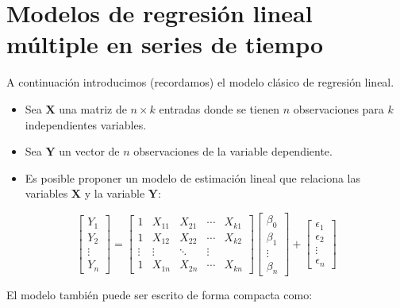 \section{Modelos de regresi\'on lineal m\'ultiple en series de tiempo}
	A continuaci\'on introducimos (recordamos) el modelo cl\'asico de regresi\'on lineal.
	\begin{itemize}
		\item Sea $\mathbf{X}$ una matriz de $n\times k$ entradas donde se tienen
		$n$ observaciones para $k$ independientes variables.
		\item Sea $\mathbf{Y}$ un vector de $n$ observaciones de la variable dependiente.
		\item Es posible proponer un modelo de estimaci\'on lineal que relaciona las
		variables $\mathbf{X}$ y la variable $\mathbf{Y}$:
	\end{itemize}
	
	\[
	\begin{bmatrix}Y_{1}\\
	Y_{2}\\
	\vdots\\
	Y_{n}
	\end{bmatrix}=\begin{bmatrix} 1 & X_{11} & X_{21} & \cdots & X_{k1}\\
	1 & X_{12} & X_{22} & \cdots & X_{k2}\\
	\vdots & \vdots & \ddots & \vdots\\
	1 & X_{1n} & X_{2n} & \cdots & X_{kn}
	\end{bmatrix}\begin{bmatrix}\beta_{0}\\
	\beta_{1}\\
	\vdots\\
	\beta_{n}
	\end{bmatrix}+\begin{bmatrix}\epsilon_{1}\\
	\epsilon_{2}\\
	\vdots\\
	\epsilon_{n}
	\end{bmatrix}
	\]
	

El modelo tambi\'en puede ser escrito de forma compacta como:

